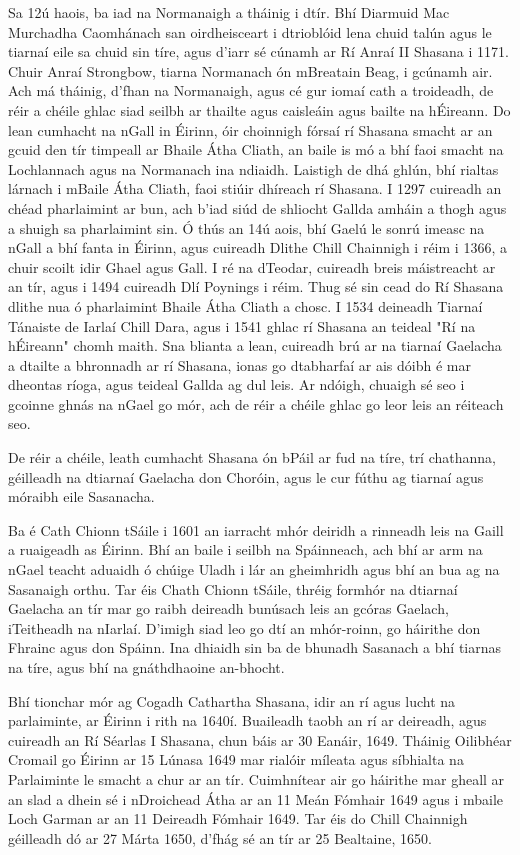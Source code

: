 \documentclass[a4paper,12pt]{article}
\theoremstyle{plain} %
\theoremstyle{definition} %
\theoremstyle{remark} %
\begin{document}
Sa 12ú haois, ba iad na Normanaigh a tháinig i dtír. Bhí Diarmuid Mac Murchadha Caomhánach san oirdheisceart i dtrioblóid lena chuid talún agus le tiarnaí eile sa chuid sin tíre, agus d'iarr sé cúnamh ar Rí Anraí II Shasana i 1171. Chuir Anraí Strongbow, tiarna Normanach ón mBreatain Beag, i gcúnamh air. Ach má tháinig, d'fhan na Normanaigh, agus cé gur iomaí cath a troideadh, de réir a chéile ghlac siad seilbh ar thailte agus caisleáin agus bailte na hÉireann. Do lean cumhacht na nGall in Éirinn, óir choinnigh fórsaí rí Shasana smacht ar an gcuid den tír timpeall ar Bhaile Átha Cliath, an baile is mó a bhí faoi smacht na Lochlannach agus na Normanach ina ndiaidh. Laistigh de dhá ghlún, bhí rialtas lárnach i mBaile Átha Cliath, faoi stiúir dhíreach rí Shasana. I 1297 cuireadh an chéad pharlaimint ar bun, ach b'iad siúd de shliocht Gallda amháin a thogh agus a shuigh sa pharlaimint sin. Ó thús an 14ú aois, bhí Gaelú le sonrú imeasc na nGall a bhí fanta in Éirinn, agus cuireadh Dlithe Chill Chainnigh i réim i 1366, a chuir scoilt idir Ghael agus Gall. I ré na dTeodar, cuireadh breis máistreacht ar an tír, agus i 1494 cuireadh Dlí Poynings i réim. Thug sé sin cead do Rí Shasana dlithe nua ó pharlaimint Bhaile Átha Cliath a chosc. I 1534 deineadh Tiarnaí Tánaiste de Iarlaí Chill Dara, agus i 1541 ghlac rí Shasana an teideal "Rí na hÉireann" chomh maith. Sna blianta a lean, cuireadh brú ar na tiarnaí Gaelacha a dtailte a bhronnadh ar rí Shasana, ionas go dtabharfaí ar ais dóibh é mar dheontas ríoga, agus teideal Gallda ag dul leis. Ar ndóigh, chuaigh sé seo i gcoinne ghnás na nGael go mór, ach de réir a chéile ghlac go leor leis an réiteach seo.

De réir a chéile, leath cumhacht Shasana ón bPáil ar fud na tíre, trí chathanna, géilleadh na dtiarnaí Gaelacha don Choróin, agus le cur fúthu ag tiarnaí agus móraibh eile Sasanacha.

Ba é Cath Chionn tSáile i 1601 an iarracht mhór deiridh a rinneadh leis na Gaill a ruaigeadh as Éirinn. Bhí an baile i seilbh na Spáinneach, ach bhí ar arm na nGael teacht aduaidh ó chúige Uladh i lár an gheimhridh agus bhí an bua ag na Sasanaigh orthu. Tar éis Chath Chionn tSáile, thréig formhór na dtiarnaí Gaelacha an tír mar go raibh deireadh bunúsach leis an gcóras Gaelach, iTeitheadh na nIarlaí. D'imigh siad leo go dtí an mhór-roinn, go háirithe don Fhrainc agus don Spáinn. Ina dhiaidh sin ba de bhunadh Sasanach a bhí tiarnas na tíre, agus bhí na gnáthdhaoine an-bhocht.

Bhí tionchar mór ag Cogadh Cathartha Shasana, idir an rí agus lucht na parlaiminte, ar Éirinn i rith na 1640í. Buaileadh taobh an rí ar deireadh, agus cuireadh an Rí Séarlas I Shasana, chun báis ar 30 Eanáir, 1649. Tháinig Oilibhéar Cromail go Éirinn ar 15 Lúnasa 1649 mar rialóir míleata agus síbhialta na Parlaiminte le smacht a chur ar an tír. Cuimhnítear air go háirithe mar gheall ar an slad a dhein sé i nDroichead Átha ar an 11 Meán Fómhair 1649 agus i mbaile Loch Garman ar an 11 Deireadh Fómhair 1649. Tar éis do Chill Chainnigh géilleadh dó ar 27 Márta 1650, d'fhág sé an tír ar 25 Bealtaine, 1650.
\end{document}
